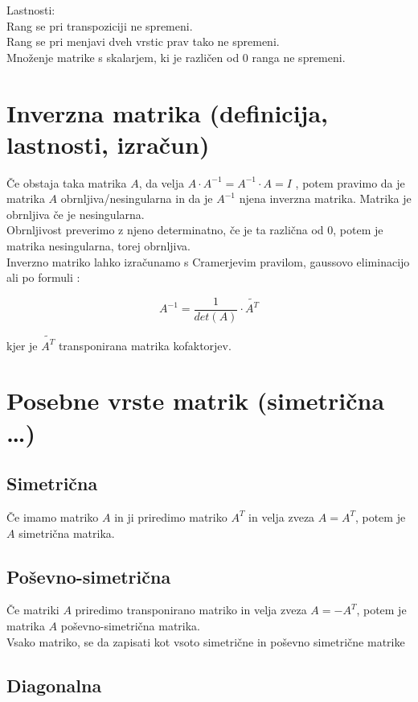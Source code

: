 \documentclass[12pt]{report}
\begin{document}
Lastnosti:\\
Rang se pri transpoziciji ne spremeni.\\
Rang se pri menjavi dveh vrstic prav tako ne spremeni.\\
Množenje matrike s skalarjem, ki je različen od 0 ranga ne spremeni.


\section*{Inverzna matrika (definicija, lastnosti, izračun)}
Če obstaja taka matrika $A$, da velja $A \cdot A^{-1} = A^{-1} \cdot A = I$
, potem pravimo da je matrika $A$ obrnljiva/nesingularna in da je $A^{-1}$ njena inverzna matrika. Matrika je obrnljiva če je nesingularna.\\
Obrnljivost preverimo z njeno determinatno, če je ta različna od 0, potem je matrika nesingularna, torej obrnljiva.\\
Inverzno matriko lahko izračunamo s Cramerjevim pravilom, gaussovo eliminacijo ali po formuli :

\[
A^{-1}=\frac{1}{det(A)}\cdot \widetilde{A^T}
\]

kjer je $\widetilde{A^T}$ transponirana matrika kofaktorjev.
\pagebreak
\section*{Posebne vrste matrik (simetrična …)}

\subsection*{Simetrična}

Če imamo matriko $A$ in ji priredimo matriko $A^T$ in velja zveza
$A = A^T$, potem je $A$ simetrična matrika.


\subsection*{Poševno-simetrična}

Če matriki $A$ priredimo transponirano matriko in velja zveza $A = -A^T$, potem je matrika $A$ poševno-simetrična matrika.\\
Vsako matriko, se da zapisati kot vsoto simetrične in poševno simetrične matrike


\subsection*{Diagonalna}
\end{document}

